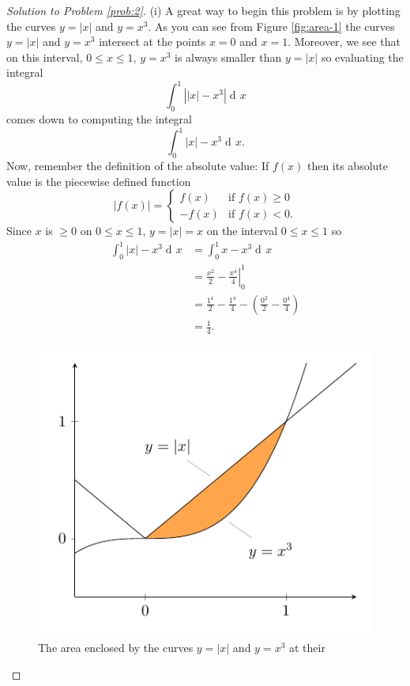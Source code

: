 \documentclass[12pt]{article}
\theoremstyle{plain}
\theoremstyle{definition}
\theoremstyle{remark}
\DeclareMathOperator{\diff}{d\!}
\begin{document}
\begin{proof}[Solution to Problem \ref{prob:2}]
(i) A great way to begin this problem is by plotting the curves $y=|x|$ and
$y=x^3$. As you can see from Figure \ref{fig:area-1} the curves $y=|x|$ and
$y=x^3$ intersect at the points $x=0$ and $x=1$. Moreover, we see that on
this interval, $0\leq x\leq 1$, $y=x^3$ is always smaller than $y=|x|$ so
evaluating the integral
 \[
\int_0^1\left||x|-x^3\right|\diff x
\]
comes down to computing the integral
\[
\int_0^1|x|-x^3\diff x.
\]
Now, remember the definition of the absolute value: If $f(x)$ then its
absolute value is the piecewise defined function
\begin{equation}
  \label{eq:absolute-value}
\left|f(x)\right|=
\begin{cases}
f(x)&\text{if $f(x)\geq 0$}\\
-f(x)&\text{if $f(x)<0$}.
\end{cases}
\end{equation}
Since $x$ is $\geq 0$ on $0\leq x\leq 1$, $y=|x|=x$ on the interval $0\leq
x\leq 1$ so
\begin{align*}
\int_0^1|x|-x^3\diff x
&=\int_0^1x-x^3\diff x\\
&=\left.\frac{x^2}{2}-\frac{x^4}{4}\right|_0^1\\
&=\frac{1^4}{2}-\frac{1^4}{4}-\left(\frac{0^2}{2}-\frac{0^4}{4}\right)\\
&=\boxed{\frac{1}{4}.}
\end{align*}
\begin{figure}[h]
\centering
\includegraphics{../figures/quiz-3-1}
\caption{The area enclosed by the curves $y=|x|$ and $y=x^3$ at their
}
\end{figure}
\end{proof}
\end{document}
